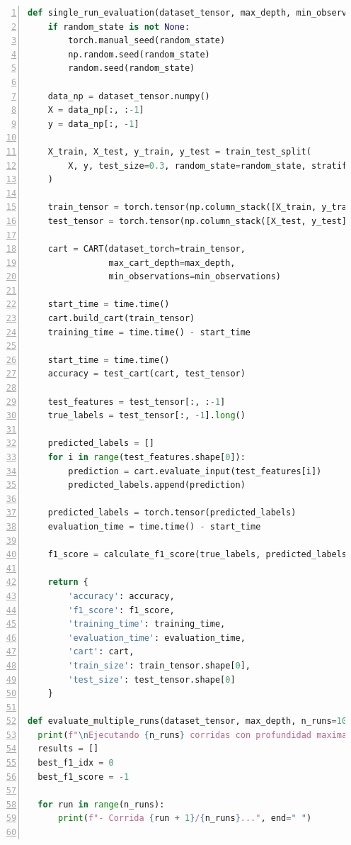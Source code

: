\documentclass[12pt,a4paper]{article}
\begin{document}
\begin{lstlisting}[language=Python, numbers=left, basicstyle=\ttfamily\tiny,label={lst:lstlisting10}]
  def single_run_evaluation(dataset_tensor, max_depth, min_observations=2, random_state=None):
    if random_state is not None:
        torch.manual_seed(random_state)
        np.random.seed(random_state)
        random.seed(random_state)

    data_np = dataset_tensor.numpy()
    X = data_np[:, :-1]
    y = data_np[:, -1]

    X_train, X_test, y_train, y_test = train_test_split(
        X, y, test_size=0.3, random_state=random_state, stratify=y
    )

    train_tensor = torch.tensor(np.column_stack([X_train, y_train]), dtype=torch.float32)
    test_tensor = torch.tensor(np.column_stack([X_test, y_test]), dtype=torch.float32)

    cart = CART(dataset_torch=train_tensor,
                max_cart_depth=max_depth,
                min_observations=min_observations)

    start_time = time.time()
    cart.build_cart(train_tensor)
    training_time = time.time() - start_time

    start_time = time.time()
    accuracy = test_cart(cart, test_tensor)

    test_features = test_tensor[:, :-1]
    true_labels = test_tensor[:, -1].long()

    predicted_labels = []
    for i in range(test_features.shape[0]):
        prediction = cart.evaluate_input(test_features[i])
        predicted_labels.append(prediction)

    predicted_labels = torch.tensor(predicted_labels)
    evaluation_time = time.time() - start_time

    f1_score = calculate_f1_score(true_labels, predicted_labels, num_classes=2)

    return {
        'accuracy': accuracy,
        'f1_score': f1_score,
        'training_time': training_time,
        'evaluation_time': evaluation_time,
        'cart': cart,
        'train_size': train_tensor.shape[0],
        'test_size': test_tensor.shape[0]
    }

def evaluate_multiple_runs(dataset_tensor, max_depth, n_runs=10, min_observations=2):
  print(f"\nEjecutando {n_runs} corridas con profundidad maxima = {max_depth}:")
  results = []
  best_f1_idx = 0
  best_f1_score = -1

  for run in range(n_runs):
      print(f"- Corrida {run + 1}/{n_runs}...", end=" ")


\end{lstlisting}
\end{document}
